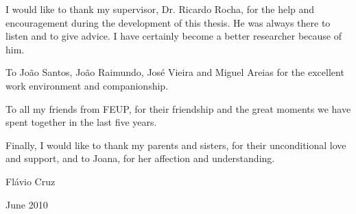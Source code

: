 I would like to thank my supervisor, Dr. Ricardo Rocha, for the help and encouragement during
the development of this thesis. He was always there to listen and to give advice. I have
certainly become a better researcher because of him.

To João Santos, João Raimundo, José Vieira and Miguel Areias for the excellent work environment
and companionship.

To all my friends from FEUP, for their friendship and the great moments we have spent together in
the last five years. 

Finally, I would like to thank my parents and sisters, for their unconditional love and support,
and to Joana, for her affection and understanding.

\begin{flushright}
   Flávio Cruz
   
   June 2010
\end{flushright}